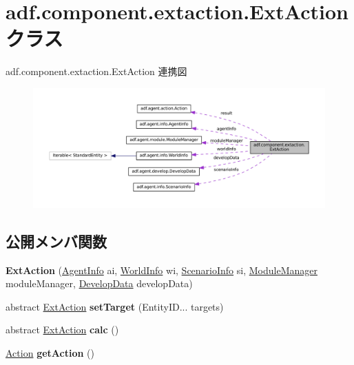 \hypertarget{classadf_1_1component_1_1extaction_1_1ExtAction}{}\section{adf.\+component.\+extaction.\+Ext\+Action クラス}
\label{classadf_1_1component_1_1extaction_1_1ExtAction}


adf.\+component.\+extaction.\+Ext\+Action 連携図
\nopagebreak
\begin{figure}[H]
\begin{center}
\leavevmode
\includegraphics[width=350pt]{classadf_1_1component_1_1extaction_1_1ExtAction__coll__graph}
\end{center}
\end{figure}
\subsection*{公開メンバ関数}
\begin{DoxyCompactItemize}
\item 
\hypertarget{classadf_1_1component_1_1extaction_1_1ExtAction_a24f45e55bf8015b446ce66c62f2c3e04}{}\label{classadf_1_1component_1_1extaction_1_1ExtAction_a24f45e55bf8015b446ce66c62f2c3e04} 
{\bfseries Ext\+Action} (\hyperlink{classadf_1_1agent_1_1info_1_1AgentInfo}{Agent\+Info} ai, \hyperlink{classadf_1_1agent_1_1info_1_1WorldInfo}{World\+Info} wi, \hyperlink{classadf_1_1agent_1_1info_1_1ScenarioInfo}{Scenario\+Info} si, \hyperlink{classadf_1_1agent_1_1module_1_1ModuleManager}{Module\+Manager} module\+Manager, \hyperlink{classadf_1_1agent_1_1develop_1_1DevelopData}{Develop\+Data} develop\+Data)
\item 
\hypertarget{classadf_1_1component_1_1extaction_1_1ExtAction_a77ec92e848e5ac3daa7b4680c9860b9a}{}\label{classadf_1_1component_1_1extaction_1_1ExtAction_a77ec92e848e5ac3daa7b4680c9860b9a} 
abstract \hyperlink{classadf_1_1component_1_1extaction_1_1ExtAction}{Ext\+Action} {\bfseries set\+Target} (Entity\+I\+D... targets)
\item 
\hypertarget{classadf_1_1component_1_1extaction_1_1ExtAction_aa059b85523f542e5c78b9eae00351cca}{}\label{classadf_1_1component_1_1extaction_1_1ExtAction_aa059b85523f542e5c78b9eae00351cca} 
abstract \hyperlink{classadf_1_1component_1_1extaction_1_1ExtAction}{Ext\+Action} {\bfseries calc} ()
\item 
\hypertarget{classadf_1_1component_1_1extaction_1_1ExtAction_aaeeadcb73477a938f9461bfd123f8193}{}\label{classadf_1_1component_1_1extaction_1_1ExtAction_aaeeadcb73477a938f9461bfd123f8193} 
\hyperlink{classadf_1_1agent_1_1action_1_1Action}{Action} {\bfseries get\+Action} ()
\end{DoxyCompactItemize}
